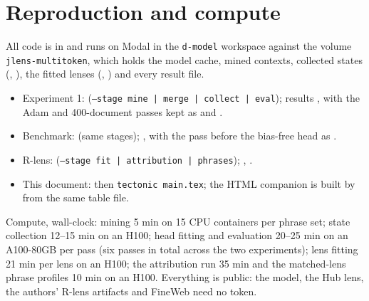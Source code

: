 \documentclass[11pt]{article}
\begin{document}
\section{Reproduction and compute}
\label{app:repro}
All code is in  and runs on Modal in the \texttt{d-model} workspace against the volume \texttt{jlens-multitoken}, which holds the model cache, mined contexts, collected states (, ), the fitted lenses (, ) and every result file.
\begin{itemize}[leftmargin=1.6em,itemsep=1pt]
\item Experiment 1:  (\texttt{--stage mine | merge | collect | eval}); results , with the Adam and 400-document passes kept as  and .
\item Benchmark:  (same stages); , with the pass before the bias-free head as .
\item R-lens:  (\texttt{--stage fit | attribution | phrases}); , .
\item This document:  then \texttt{tectonic main.tex}; the HTML companion  is built by  from the same table file.
\end{itemize}
Compute, wall-clock: mining 5 min on 15 CPU containers per phrase set; state collection 12--15 min on an H100; head fitting and evaluation 20--25 min on an A100-80GB per pass (six passes in total across the two experiments); lens fitting 21 min per lens on an H100; the attribution run 35 min and the matched-lens phrase profiles 10 min on an H100. Everything is public: the model, the Hub lens, the authors' R-lens artifacts and FineWeb need no token.
\end{document}
